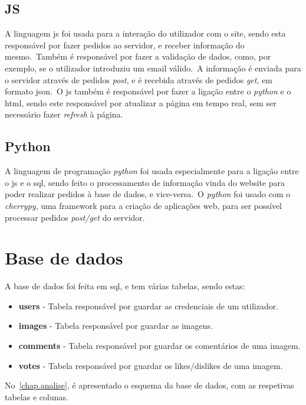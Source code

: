 \documentclass{report}
\begin{document}
\subsection{JS}\label{subsec:js}
    A linguagem \ac{js} foi usada para a interação do utilizador com o site, sendo esta responsável por fazer pedidos ao servidor, e receber informação do mesmo.\ Também é responsável por fazer a validação de dados, como, por exemplo, se o utilizador introduziu um email válido.\ A informação é enviada para o servidor através de pedidos \textit{post}, e é recebida através de pedidos \textit{get}, em formato \ac{json}.\ O \ac{js} também é responsável por fazer a ligação entre o \textit{python} e o \ac{html}, sendo este responsável por atualizar a página em tempo real, sem ser necessário fazer \textit{refresh} à página.\\

\subsection{Python}\label{subsec:python}
    A linguagem de programação \textit{python} foi usada especialmente para a ligação entre o \ac{js} e o \ac{sql}, sendo feito o processamento de informação vinda do website para poder realizar pedidos à base de dados, e vice-versa.\ O \textit{python} foi usado com o \textit{cherrypy}, uma framework para a criação de aplicações web, para ser possível processar pedidos \textit{post/get} do servidor.

\section{Base de dados}\label{sec:base-de-dados}
    A base de dados foi feita em \ac{sql}, e tem várias tabelas, sendo estas:
    \begin{itemize}
        \item \textbf{users} - Tabela responsável por guardar as credenciais de um utilizador.
        \item \textbf{images} - Tabela responsável por guardar as imagens.
        \item \textbf{comments} - Tabela responsável por guardar os comentários de uma imagem.
        \item \textbf{votes} - Tabela responsável por guardar os likes/dislikes de uma imagem.
    \end{itemize}
    No~\ref{chap.analise}, é apresentado o esquema da base de dados, com as respetivas tabelas e colunas.
\end{document}
